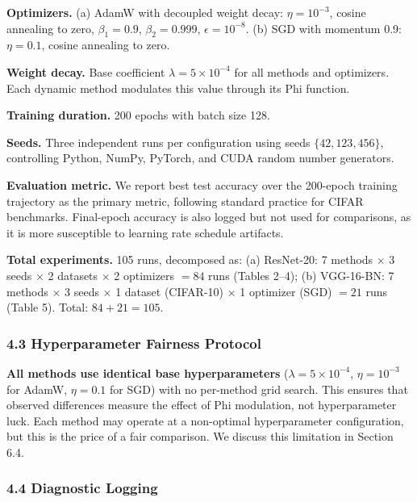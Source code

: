 \documentclass[
]{article}
\begin{document}
\textbf{Optimizers.} (a) AdamW with decoupled weight decay:
\(\eta = 10^{-3}\), cosine annealing to zero, \(\beta_1 = 0.9\),
\(\beta_2 = 0.999\), \(\epsilon = 10^{-8}\). (b) SGD with momentum 0.9:
\(\eta = 0.1\), cosine annealing to zero.

\textbf{Weight decay.} Base coefficient \(\lambda = 5 \times 10^{-4}\)
for all methods and optimizers. Each dynamic method modulates this value
through its Phi function.

\textbf{Training duration.} 200 epochs with batch size 128.

\textbf{Seeds.} Three independent runs per configuration using seeds
\(\{42, 123, 456\}\), controlling Python, NumPy, PyTorch, and CUDA
random number generators.

\textbf{Evaluation metric.} We report best test accuracy over the
200-epoch training trajectory as the primary metric, following standard
practice for CIFAR benchmarks. Final-epoch accuracy is also logged but
not used for comparisons, as it is more susceptible to learning rate
schedule artifacts.

\textbf{Total experiments.} 105 runs, decomposed as: (a) ResNet-20: 7
methods \(\times\) 3 seeds \(\times\) 2 datasets \(\times\) 2 optimizers
\(= 84\) runs (Tables 2--4); (b) VGG-16-BN: 7 methods \(\times\) 3 seeds
\(\times\) 1 dataset (CIFAR-10) \(\times\) 1 optimizer (SGD) \(= 21\)
runs (Table 5). Total: \(84 + 21 = 105\).

\hypertarget{hyperparameter-fairness-protocol}{%
\subsubsection{4.3 Hyperparameter Fairness
Protocol}\label{hyperparameter-fairness-protocol}}

\textbf{All methods use identical base hyperparameters}
(\(\lambda = 5 \times 10^{-4}\), \(\eta = 10^{-3}\) for AdamW,
\(\eta = 0.1\) for SGD) with no per-method grid search. This ensures
that observed differences measure the effect of Phi modulation, not
hyperparameter luck. Each method may operate at a non-optimal
hyperparameter configuration, but this is the price of a fair
comparison. We discuss this limitation in Section 6.4.

\hypertarget{diagnostic-logging}{%
\subsubsection{4.4 Diagnostic Logging}\label{diagnostic-logging}}
\end{document}
